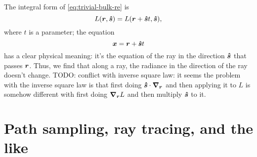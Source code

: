 \documentclass[hyperref, a4paper]{article}
\begin{document}
The integral form of \eqref{eq:trivial-bulk-re} is 
\begin{equation}
    L(\vb*{r}, \vu*{s}) = L(\vb*{r} + \vu*{s} t , \vu*{s}),
\end{equation}
where $t$ is a parameter; the equation 
\begin{equation}
    \vb*{x} = \vb*{r} + \vu*{s} t 
\end{equation}
has a clear physical meaning: it's the equation of the ray 
in the direction $\vu*{s}$ that passes $\vb*{r}$.
Thus, we find that along a ray, 
the radiance in the direction of the ray doesn't change. 
TODO: conflict with inverse square law: 
it seems the problem with the inverse square law is that 
first doing $\vu*{s} \cdot \grad_{\vb*{r}}$ 
and then applying it to $L$ 
is somehow different with first doing $\grad_{\vb*{r}} L$
and then multiply $\vu*{s}$ to it. 

\section{Path sampling, ray tracing, and the like}
\end{document}
